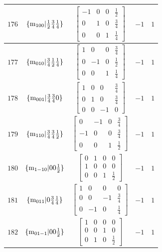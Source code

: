 \documentclass[fleqn,8pt]{jsarticle}
\begin{document}
\begin{longtable}{ccccc}
$ 176 $ & $ \{{\rm m}_{100}|\frac{1}{2} \frac{3}{4} \frac{1}{4}\} $ & $ \begin{bmatrix} -1 & 0 & 0 & \frac{1}{2} \\ 0 & 1 & 0 & \frac{3}{4} \\ 0 & 0 & 1 & \frac{1}{4} \end{bmatrix} $ & $ -1 $ & $ 1 $ \\ \hline
$ 177 $ & $ \{{\rm m}_{010}|\frac{3}{4} \frac{1}{2} \frac{1}{4}\} $ & $ \begin{bmatrix} 1 & 0 & 0 & \frac{3}{4} \\ 0 & -1 & 0 & \frac{1}{2} \\ 0 & 0 & 1 & \frac{1}{4} \end{bmatrix} $ & $ -1 $ & $ 1 $ \\ \hline
$ 178 $ & $ \{{\rm m}_{001}|\frac{3}{4} \frac{3}{4} 0\} $ & $ \begin{bmatrix} 1 & 0 & 0 & \frac{3}{4} \\ 0 & 1 & 0 & \frac{3}{4} \\ 0 & 0 & -1 & 0 \end{bmatrix} $ & $ -1 $ & $ 1 $ \\ \hline
$ 179 $ & $ \{{\rm m}_{110}|\frac{3}{4} \frac{3}{4} \frac{1}{2}\} $ & $ \begin{bmatrix} 0 & -1 & 0 & \frac{3}{4} \\ -1 & 0 & 0 & \frac{3}{4} \\ 0 & 0 & 1 & \frac{1}{2} \end{bmatrix} $ & $ -1 $ & $ 1 $ \\ \hline
$ 180 $ & $ \{{\rm m}_{1-10}|0 0 \frac{1}{2}\} $ & $ \begin{bmatrix} 0 & 1 & 0 & 0 \\ 1 & 0 & 0 & 0 \\ 0 & 0 & 1 & \frac{1}{2} \end{bmatrix} $ & $ -1 $ & $ 1 $ \\ \hline
$ 181 $ & $ \{{\rm m}_{011}|0 \frac{3}{4} \frac{1}{4}\} $ & $ \begin{bmatrix} 1 & 0 & 0 & 0 \\ 0 & 0 & -1 & \frac{3}{4} \\ 0 & -1 & 0 & \frac{1}{4} \end{bmatrix} $ & $ -1 $ & $ 1 $ \\ \hline
$ 182 $ & $ \{{\rm m}_{01-1}|0 0 \frac{1}{2}\} $ & $ \begin{bmatrix} 1 & 0 & 0 & 0 \\ 0 & 0 & 1 & 0 \\ 0 & 1 & 0 & \frac{1}{2} \end{bmatrix} $ & $ -1 $ & $ 1 $ \\ \hline

\end{longtable}
\end{document}
